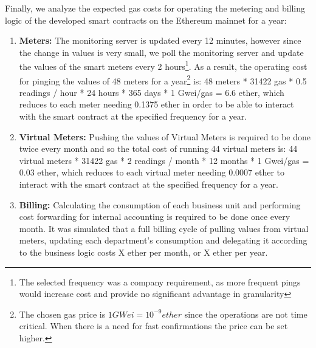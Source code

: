 Finally, we analyze the expected gas costs for operating the metering and billing logic of the developed smart contracts on the Ethereum mainnet for a year:

\begin{enumerate}
    \item \textbf{Meters:} The monitoring server is updated every 12 minutes, however since the change in values is very small, we poll the monitoring server and update the values of the smart meters every 2 hours\footnote{The selected frequency was a company requirement, as more frequent pings would increase cost and provide no significant advantage in granularity}. As a result, the operating cost for pinging the values of 48 meters for a year\footnote{The chosen gas price is $1 GWei = 10^{-9} ether$ since the operations are not time critical. When there is a need for fast confirmations the price can be set higher.} is: 48 meters * 31422 gas * 0.5 readings / hour * 24 hours * 365 days * 1 Gwei/gas  = 6.6 ether, which reduces to each meter needing 0.1375 ether in order to be able to interact with the smart contract at the specified frequency for a year. 
    \item \textbf{Virtual Meters:} Pushing the values of Virtual Meters is required to be done twice every month and so the total cost of running 44 virtual meters is: 44 virtual meters * 31422 gas * 2 readings / month * 12 months * 1 Gwei/gas  = 0.03 ether, which reduces to each virtual meter needing 0.0007 ether to interact with the smart contract at the specified frequency for a year. 
    \item \textbf{Billing:} Calculating the consumption of each business unit and performing cost forwarding for internal accounting is required to be done once every month. It was simulated that a full billing cycle of pulling values from virtual meters, updating each department's consumption and delegating it according to the business logic costs X ether per month, or X ether per year.  %
\end{enumerate}
